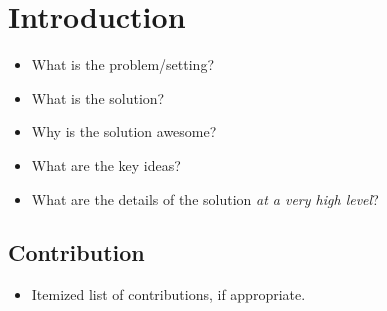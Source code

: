 \section{Introduction}\label{sec:intro}

\begin{itemize}
  \item What is the problem/setting?
  \item What is the solution?
  \item Why is the solution awesome?
  \item What are the key ideas?
  \item What are the details of the solution \emph{at a very high level}?
\end{itemize}

\subsection{Contribution}
\begin{itemize}
  \item Itemized list of contributions, if appropriate.
\end{itemize}
